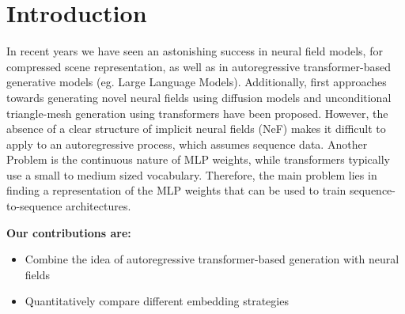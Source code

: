 \section{Introduction}
\label{sec:intro}

In recent years we have seen an astonishing success in neural field models, for compressed scene representation, as well as in autoregressive
transformer-based generative models (eg. Large Language Models).
Additionally, first approaches towards generating novel neural fields using diffusion models \cite{erkoç2023hyperdiffusion} and unconditional triangle-mesh generation using transformers \cite{siddiqui2023meshgpt} have been proposed.
However, the absence of a clear structure of implicit neural fields (NeF) makes it difficult to apply to an autoregressive process, which assumes sequence data. Another Problem is the continuous nature of MLP weights, while transformers typically use a small to medium sized vocabulary.
Therefore, the main problem lies in finding a representation of the MLP weights that can be used to train sequence-to-sequence architectures.

\noindent \textbf{Our contributions are:}
\begin{itemize}
    \item Combine the idea of autoregressive transformer-based generation with neural fields
    \item Quantitatively compare different embedding strategies
\end{itemize}
